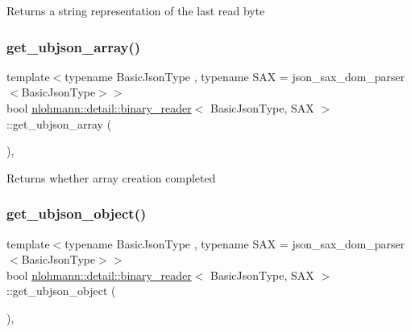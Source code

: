 \begin{DoxyReturn}{Returns}
a string representation of the last read byte 
\end{DoxyReturn}
\mbox{\label{classnlohmann_1_1detail_1_1binary__reader_a4e8ef9561d4403ea68e3c2712fd289e2}} 
\subsubsection{\texorpdfstring{get\_ubjson\_array()}{get\_ubjson\_array()}}
{\footnotesize\ttfamily template$<$typename Basic\+Json\+Type , typename S\+AX  = json\+\_\+sax\+\_\+dom\+\_\+parser$<$\+Basic\+Json\+Type$>$$>$ \\
bool \mbox{\hyperlink{classnlohmann_1_1detail_1_1binary__reader}{nlohmann\+::detail\+::binary\+\_\+reader}}$<$ Basic\+Json\+Type, S\+AX $>$\+::get\+\_\+ubjson\+\_\+array (\begin{DoxyParamCaption}{ }\end{DoxyParamCaption})\hspace{0.3cm}{\ttfamily [inline]}, {\ttfamily [private]}}

\begin{DoxyReturn}{Returns}
whether array creation completed 
\end{DoxyReturn}
\mbox{\label{classnlohmann_1_1detail_1_1binary__reader_ad0932dd568fcbbd2b4c2ccf9122544a5}} 
\subsubsection{\texorpdfstring{get\_ubjson\_object()}{get\_ubjson\_object()}}
{\footnotesize\ttfamily template$<$typename Basic\+Json\+Type , typename S\+AX  = json\+\_\+sax\+\_\+dom\+\_\+parser$<$\+Basic\+Json\+Type$>$$>$ \\
bool \mbox{\hyperlink{classnlohmann_1_1detail_1_1binary__reader}{nlohmann\+::detail\+::binary\+\_\+reader}}$<$ Basic\+Json\+Type, S\+AX $>$\+::get\+\_\+ubjson\+\_\+object (\begin{DoxyParamCaption}{ }\end{DoxyParamCaption})\hspace{0.3cm}{\ttfamily [inline]}, {\ttfamily [private]}}

